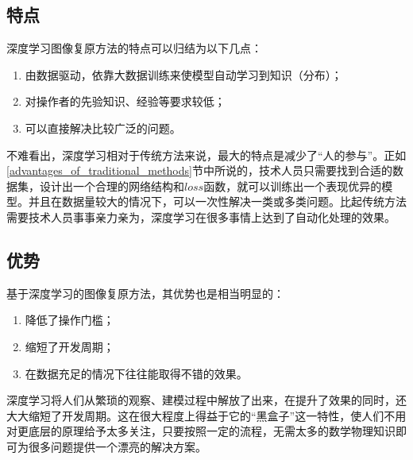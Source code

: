 \documentclass[UTF8]{ctexart}
\begin{document}
        \subsection{特点}
            \indent 深度学习图像复原方法的特点可以归结为以下几点：
            
    			\begin{enumerate}[leftmargin=50pt]
    				\item 由数据驱动，依靠大数据训练来使模型自动学习到知识（分布）；
    				\item 对操作者的先验知识、经验等要求较低；
    				\item 可以直接解决比较广泛的问题。
    			\end{enumerate}
            
            \indent 不难看出，深度学习相对于传统方法来说，最大的特点是减少了“人的参与”。正如\ref{advantages_of_traditional_methods}节中所说的，技术人员只需要找到合适的数据集，设计出一个合理的网络结构和$loss$函数，就可以训练出一个表现优异的模型。并且在数据量较大的情况下，可以一次性解决一类或多类问题。比起传统方法需要技术人员事事亲力亲为，深度学习在很多事情上达到了自动化处理的效果。
    			
        \subsection{优势}
            \indent 基于深度学习的图像复原方法，其优势也是相当明显的：
         
            
    			\begin{enumerate}[leftmargin=50pt]
    				\item 降低了操作门槛；
                    \item 缩短了开发周期；
                    \item 在数据充足的情况下往往能取得不错的效果。
    			\end{enumerate}
                
            \indent 深度学习将人们从繁琐的观察、建模过程中解放了出来，在提升了效果的同时，还大大缩短了开发周期。这在很大程度上得益于它的“黑盒子”这一特性，使人们不用对更底层的原理给予太多关注，只要按照一定的流程，无需太多的数学物理知识即可为很多问题提供一个漂亮的解决方案。
                
\end{document}
